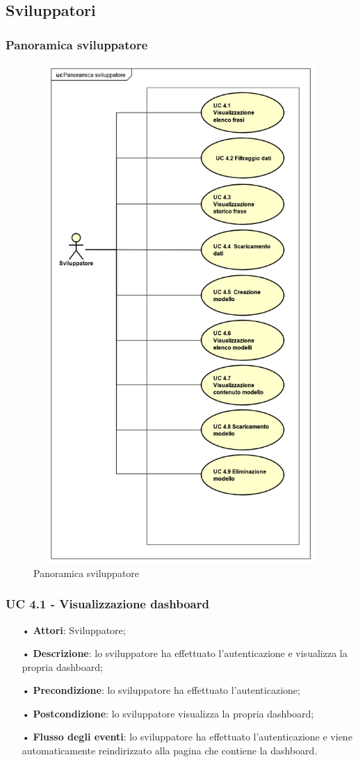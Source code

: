 \subsection{Sviluppatori}
\subsubsection{Panoramica sviluppatore}
\begin{figure}[H]
	\centering
	\includegraphics[width=17cm, height = 19cm]{img/UC4x.png} 
	\caption{Panoramica sviluppatore}\label{fig:4x}
\end{figure}
\subsubsection{UC 4.1 - Visualizzazione dashboard}
\begin{itemize}
	\item[•]\textbf{Attori}: Sviluppatore;
	\item[•]\textbf{Descrizione}: lo sviluppatore ha effettuato l'autenticazione e visualizza la propria dashboard;
	\item[•]\textbf{Precondizione}: lo sviluppatore ha effettuato l'autenticazione;
	\item[•]\textbf{Postcondizione}: lo sviluppatore visualizza la propria dashboard; 
	\item[•]\textbf{Flusso degli eventi}: lo sviluppatore ha effettuato l'autenticazione e viene automaticamente reindirizzato alla pagina che contiene la dashboard.
\end{itemize}
